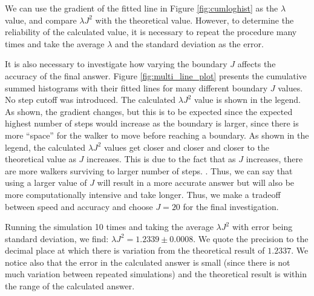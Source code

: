 \documentclass[journal]{IEEEtran}
\begin{document}
We can use the gradient of the fitted line in Figure \ref{fig:cumloghist} as the
$\lambda$ value, and compare $\lambda J^2$ with the theoretical value. However,
to determine the reliability of the calculated value, it is necessary to repeat
the procedure many times and take the average $\lambda$ and the standard
deviation as the error.

It is also necessary to investigate how varying the boundary $J$ affects the
accuracy of the final answer. Figure \ref{fig:multi_line_plot} presents the
cumulative summed histograms with their fitted lines for many different boundary
$J$ values. No step cutoff was introduced. The calculated $\lambda J^2$ value is
shown in the legend.  As shown, the gradient changes, but
this is to be expected since the expected highest number of steps would increase
as the boundary is larger, since there is more ``space'' for the walker to move
before reaching a boundary. As shown in the legend, the calculated $\lambda J^2$
values get closer and closer and closer to the theoretical value as $J$
increases. This is due to the fact that as $J$ increases, there are more walkers
surviving to larger number of steps. .
Thus, we can say that using a larger value of $J$ will result in a more
accurate answer but will also be more computationally intensive and take
longer. Thus, we make a tradeoff between speed and accuracy and choose $J=20$
for the final investigation.

Running the simulation 10 times and taking the average $\lambda J^2$ with error
being standard deviation, we find: $\lambda J^2 = 1.2339 \pm 0.0008$. We quote
the precision to the decimal place at which there is variation from the
theoretical result of $1.2337$. We notice also that the error in the calculated
answer is small (since there is not much variation between repeated simulations)
and the theoretical result is within the range of the calculated answer.
\end{document}
